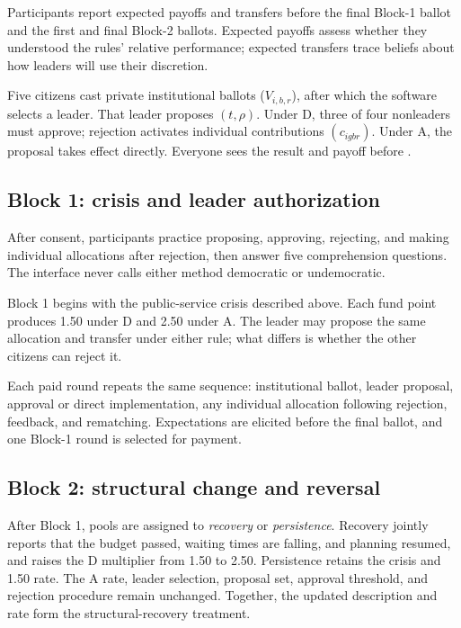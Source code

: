 \documentclass[11pt,a4paper]{article}
\newcommand{\Dproc}{\textsf{D}}
\newcommand{\Aproc}{\textsf{A}}
\begin{document}
Participants report expected payoffs and transfers before the final Block-1 ballot and the first and final Block-2 ballots. Expected payoffs assess whether they understood the rules' relative performance; expected transfers trace beliefs about how leaders will use their discretion.


\begin{plainlanguagebox}
Five citizens cast private institutional ballots ($V_{i,b,r}$), after which the software selects a leader. That leader proposes $(t,\rho)$. Under \Dproc{}, three of four nonleaders must approve; rejection activates individual contributions $(c_{igbr})$. Under \Aproc{}, the proposal takes effect directly. Everyone sees the result and payoff before .
\end{plainlanguagebox}

\subsection{Block 1: crisis and leader authorization}

After consent, participants practice proposing, approving, rejecting, and making individual allocations after rejection, then answer five comprehension questions. The interface never calls either method democratic or undemocratic.

Block 1 begins with the public-service crisis described above. Each fund point produces 1.50 under \Dproc{} and 2.50 under \Aproc{}. The leader may propose the same allocation and transfer under either rule; what differs is whether the other citizens can reject it.

Each paid round repeats the same sequence: institutional ballot, leader proposal, approval or direct implementation, any individual allocation following rejection, feedback, and rematching. Expectations are elicited before the final ballot, and one Block-1 round is selected for payment.

\subsection{Block 2: structural change and reversal}

After Block 1, pools are assigned to \emph{recovery} or \emph{persistence}. Recovery jointly reports that the budget passed, waiting times are falling, and planning resumed, and raises the \Dproc{} multiplier from 1.50 to 2.50. Persistence retains the crisis and 1.50 rate. The \Aproc{} rate, leader selection, proposal set, approval threshold, and rejection procedure remain unchanged. Together, the updated description and rate form the structural-recovery treatment.
\end{document}
